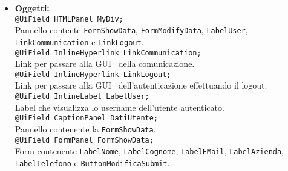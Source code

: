 {\begin{sloppypar}
{\begin{itemize}
\begin{itemize}
				\texttt{- IDataUserLogic dataUserLogic;}\\
				Riferimento alla classe \texttt{DataUserLogic}.\\
				
				\texttt{- IShowDataUser showData;}\\
				Riferimento alla classe \texttt{ShowDataUser}.\\
				
				\texttt{- IModifyDataUser modifyData;}\\
				Riferimento alla classe \texttt{ModifyDataUser}.\\
				
				\texttt{- boolean checkModify;}\\
				Indica se l'utente desidera modificare la password.\\
				
				\texttt{- String attPassword;}\\
				Password attuale.\\

			\item[] \textbf{Oggetti:}\\
				\texttt{@UiField HTMLPanel MyDiv;}\\
				Pannello contente \texttt{FormShowData}, \texttt{FormModifyData}, \texttt{LabelUser}, \texttt{LinkCommunication} e \texttt{LinkLogout}.\\
				
				\texttt{@UiField InlineHyperlink LinkCommunication;}\\
				Link per passare alla GUI\g~ della comunicazione.\\
				
				\texttt{@UiField InlineHyperlink LinkLogout;}\\
				Link per passare alla GUI\g~ dell'autenticazione effettuando il logout.\\
				
				\texttt{@UiField InlineLabel LabelUser;}\\
				Label che visualizza lo username dell'utente autenticato.\\
				
				\texttt{@UiField CaptionPanel DatiUtente;}\\
				Pannello contenente la \texttt{FormShowData}.\\
				
				\texttt{@UiField FormPanel FormShowData;}\\
				Form contenente \texttt{LabelNome}, \texttt{LabelCognome}, \texttt{LabelEMail}, \texttt{LabelAzienda}, \texttt{LabelTelefono} e \texttt{ButtonModificaSubmit}.\\


\end{itemize}
\end{itemize}}
\end{sloppypar}}
